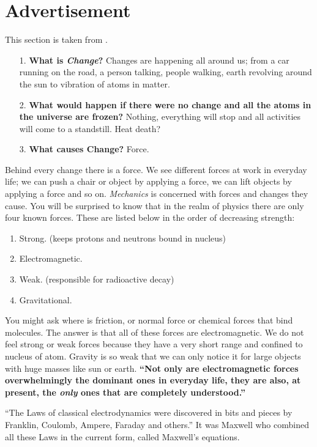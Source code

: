 \documentclass[12pt,a4paper]{article}
\begin{document}
\section{Advertisement}
This section is taken from \cite{Griffith}.
\begin{itemize}
	\item[1.] \textbf{What is \textit{Change}?} Changes are happening all around us; from a car running on the road, a person talking, people walking, earth revolving around the sun to vibration of atoms in matter.
	\item[2.] \textbf{What would happen if there were no change and all the atoms in the universe are frozen?} Nothing, everything will stop and all activities will come to a standstill. Heat death?
	\item[3.] \textbf{What causes Change?} Force.
\end{itemize}
Behind every change there is a force. We see different forces at work in everyday life; we can push a chair or object by applying a force, we can lift objects by applying a force and so on. \textit{Mechanics} is concerned with forces and changes they cause. You will be surprised to know that in the realm of physics there are only four known forces. These are listed below in the order of decreasing strength:
\begin{enumerate}
\item Strong. (keeps protons and neutrons bound in nucleus)
\item Electromagnetic.
\item Weak. (responsible for radioactive decay)
\item Gravitational.
\end{enumerate}
You might ask where is friction, or normal force or chemical forces that bind molecules. The answer is that all of these forces are electromagnetic. We do not feel strong or weak forces because they have a very short range and confined to nucleus of atom. Gravity is so weak that we can only notice it for large objects with huge masses like sun or earth. \textbf{``Not only are electromagnetic forces overwhelmingly the dominant ones in everyday life, they are also, at present, the \textit{only} ones that are completely understood.''}\cite[page 14]{Griffith}

``The Laws of classical electrodynamics were discovered in bits and pieces by Franklin, Coulomb, Ampere, Faraday and others.'' It was Maxwell who combined all these Laws in the current form, called Maxwell's equations.
\end{document}
